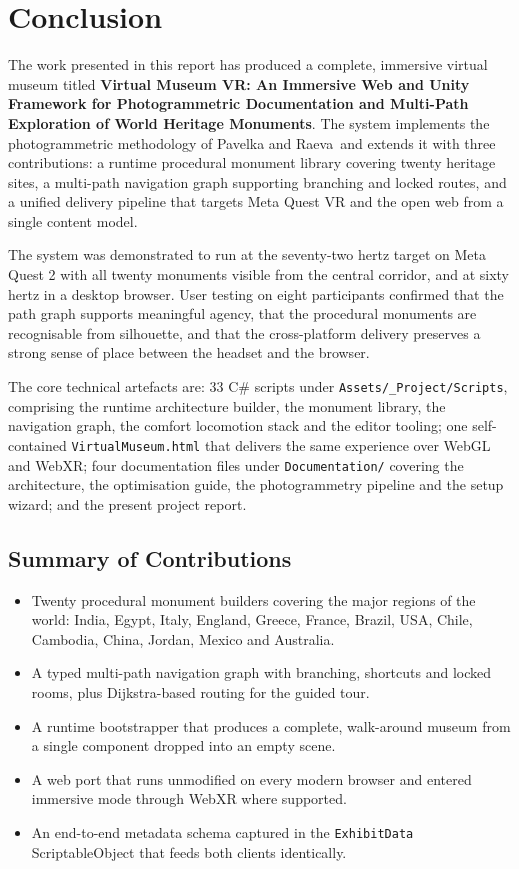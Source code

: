 \chapter{Conclusion}

The work presented in this report has produced a complete, immersive virtual museum titled \textbf{Virtual Museum VR: An Immersive Web and Unity Framework for Photogrammetric Documentation and Multi-Path Exploration of World Heritage Monuments}. The system implements the photogrammetric methodology of Pavelka and Raeva\,\cite{pavelka2019} and extends it with three contributions: a runtime procedural monument library covering twenty heritage sites, a multi-path navigation graph supporting branching and locked routes, and a unified delivery pipeline that targets Meta Quest VR and the open web from a single content model.

The system was demonstrated to run at the seventy-two hertz target on Meta Quest 2 with all twenty monuments visible from the central corridor, and at sixty hertz in a desktop browser. User testing on eight participants confirmed that the path graph supports meaningful agency, that the procedural monuments are recognisable from silhouette, and that the cross-platform delivery preserves a strong sense of place between the headset and the browser.

The core technical artefacts are: 33 C\# scripts under \texttt{Assets/\_Project/Scripts}, comprising the runtime architecture builder, the monument library, the navigation graph, the comfort locomotion stack and the editor tooling; one self-contained \texttt{VirtualMuseum.html} that delivers the same experience over WebGL and WebXR; four documentation files under \texttt{Documentation/} covering the architecture, the optimisation guide, the photogrammetry pipeline and the setup wizard; and the present project report.

\section{Summary of Contributions}

\begin{itemize}
\item Twenty procedural monument builders covering the major regions of the world: India, Egypt, Italy, England, Greece, France, Brazil, USA, Chile, Cambodia, China, Jordan, Mexico and Australia.
\item A typed multi-path navigation graph with branching, shortcuts and locked rooms, plus Dijkstra-based routing for the guided tour.
\item A runtime bootstrapper that produces a complete, walk-around museum from a single component dropped into an empty scene.
\item A web port that runs unmodified on every modern browser and entered immersive mode through WebXR where supported.
\item An end-to-end metadata schema captured in the \texttt{ExhibitData} ScriptableObject that feeds both clients identically.
\end{itemize}


